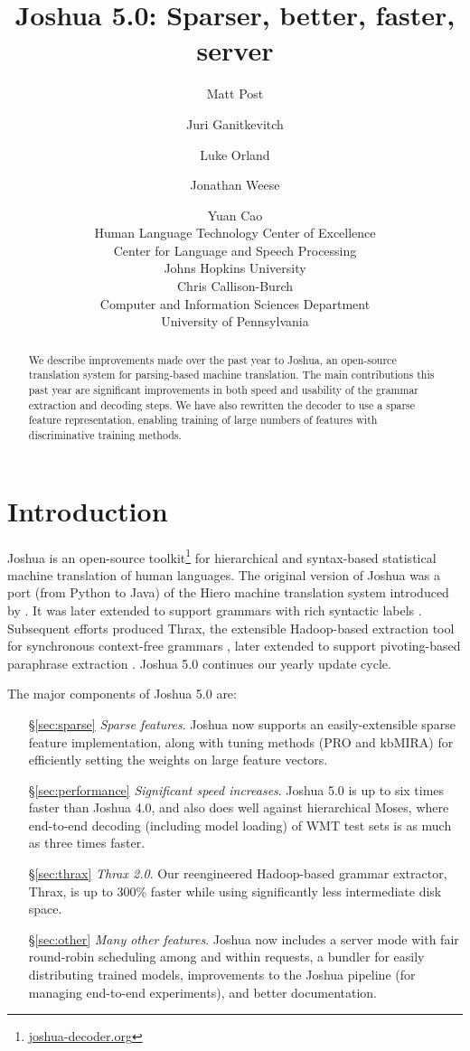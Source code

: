 \documentclass[11pt]{article}
\title{Joshua 5.0: Sparser, better, faster, server}
\author{Matt Post\hltcoe 
  \and Juri Ganitkevitch\clsp 
  \and Luke Orland\hltcoe
  \and Jonathan Weese\clsp
  \and Yuan Cao\clsp  \\
  \hltcoe Human Language Technology Center of Excellence \\
  \clsp Center for Language and Speech Processing \\
  Johns Hopkins University \\
  \AND  Chris Callison-Burch \\
  Computer and Information Sciences Department \\
  University of Pennsylvania \\
}
\date{}
\begin{document}
\maketitle

\begin{abstract}
  We describe improvements made over the past year to Joshua, an
  open-source translation system for parsing-based machine
  translation. The main contributions this past year are significant
  improvements in both speed and usability of the grammar extraction
  and decoding steps. We have also rewritten the decoder to use a
  sparse feature representation, enabling training of large numbers of
  features with discriminative training methods.
\end{abstract}

\section{Introduction}
\label{sec-intro}

Joshua is an open-source toolkit\footnote{\url{joshua-decoder.org}}
for hierarchical and syntax-based statistical machine translation of
human languages.  The original version of Joshua \cite{Joshua-WMT} was
a port (from Python to Java) of the Hiero machine translation system
introduced by .  It was later extended to support
grammars with rich syntactic labels \cite{li2010joshua}. Subsequent
efforts produced Thrax, the extensible Hadoop-based extraction tool
for synchronous context-free grammars \cite{Joshua-3.0}, later
extended to support pivoting-based paraphrase extraction
\cite{Joshua-4.0}. Joshua 5.0 continues our yearly update cycle. 

The major components of Joshua 5.0 are:

\begin{itemize}
  \item[\S\ref{sec:sparse}] \emph{Sparse features}. Joshua now supports an
    easily-extensible sparse feature implementation, along with tuning
    methods (PRO and kbMIRA) for efficiently setting the weights on
    large feature vectors.
  \item[\S\ref{sec:performance}] \emph{Significant speed
    increases}. Joshua 5.0 is up to six times faster than Joshua 4.0,
    and also does well against hierarchical Moses, where end-to-end
    decoding (including model loading) of WMT test sets is as much as
    three times faster.
  \item[\S\ref{sec:thrax}] \emph{Thrax 2.0}. Our reengineered
    Hadoop-based grammar extractor, Thrax, is up to 300\% faster while
    using significantly less intermediate disk space.
  \item[\S\ref{sec:other}] \emph{Many other features}. Joshua now
    includes a server mode with fair round-robin scheduling among and
    within requests, a bundler for easily distributing trained models,
    improvements to the Joshua pipeline (for managing end-to-end
    experiments), and better documentation.
\end{itemize}
\end{document}
